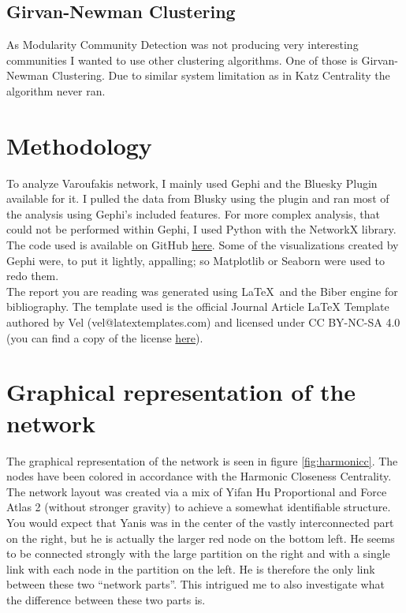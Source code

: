 \documentclass[
	a4paper, %
	12pt, %
	twoside, %
]{LTJournalArticle}
\begin{document}
\subsection{Girvan-Newman Clustering}
As Modularity Community Detection was not producing very interesting communities I wanted to use other clustering algorithms. One of those is Girvan-Newman Clustering. Due to similar system limitation as in Katz Centrality the algorithm never ran.

\section{Methodology}
To analyze Varoufakis network, I mainly used Gephi and the Bluesky Plugin available for it. I pulled the data from Blusky using the plugin and ran most of the analysis using Gephi’s included features. For more complex analysis, that could not be performed within Gephi, I used Python with the NetworkX library. The code used is available on GitHub \href{https://github.com/panos1b/Network-Science-Project}{here}. Some of the visualizations created by Gephi were, to put it lightly, appalling; so Matplotlib or Seaborn were used to redo them. \\
The report you are reading was generated using \LaTeX\ and the Biber engine for bibliography. The template used is the official Journal Article LaTeX Template authored by Vel (vel@latextemplates.com) and licensed under CC BY-NC-SA 4.0 (you can find a copy of the license \href{https://creativecommons.org/licenses/by-nc-sa/4.0/}{here}).


\section{Graphical representation of the network}

The graphical representation of the network is seen in figure \ref{fig:harmonicc}. The nodes have been colored in accordance with the Harmonic Closeness Centrality. The network layout was created via a mix of Yifan Hu Proportional and Force Atlas 2 (without stronger gravity) to achieve a somewhat identifiable structure. You would expect that Yanis was in the center of the vastly interconnected part on the right, but he is actually the larger red node on the bottom left. He seems to be connected strongly with the large partition on the right and with a single link with each node in the partition on the left. He is therefore the only link between these two “network parts”. This intrigued me to also investigate what the difference between these two parts is.
\end{document}
